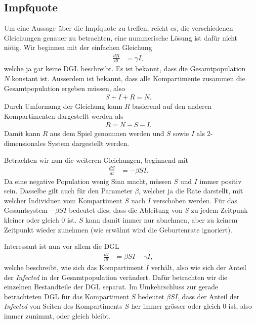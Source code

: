 \begin{refsection}
\section{Impfquote}
Um eine Aussage über die Impfquote zu treffen, reicht es, die verschiedenen Gleichungen genauer zu betrachten, eine nummerische Lösung ist dafür nicht nötig.
Wir beginnen mit der einfachen Gleichung
\begin{align*}
  \frac{dR}{dt} &= \gamma I,
\end{align*}
welche ja gar keine DGL beschreibt. 
Es ist bekannt, dass die Gesamtpopulation $N$ konstant ist. 
Ausserdem ist bekannt, dass alle Kompartimente zusammen die Gesamtpopulation ergeben müssen, also
\begin{align*}
  S + I + R = N.
\end{align*}
Durch Umformung der Gleichung kann $R$ basierend auf den anderen Kompartimenten dargestellt werden als
\begin{align*}
  R = N - S - I.
\end{align*}
Damit kann $R$ aus dem Spiel genommen werden und $S$ sowie $I$ als 2-dimensionales System dargestellt werden.

Betrachten wir nun die weiteren Gleichungen, beginnend mit 
\begin{align*}
  \frac{dS}{dt} & = -\beta S I.
\end{align*}
Da eine negative Population wenig Sinn macht, müssen $S$ und $I$ immer positiv sein. 
Dasselbe gilt auch für den Parameter $\beta$, welcher ja die Rate darstellt, mit welcher Individuen vom Kompartiment $S$ nach $I$ verschoben werden.
Für das Gesamtsystem $-\beta S I$ bedeutet dies, dass die Ableitung von $S$ zu jedem Zeitpunk kleiner oder gleich 0 ist. $S$ kann damit immer nur abnehmen, aber zu keinem Zeitpunkt wieder zunehmen (wie erwähnt wird die Geburtenrate ignoriert).

Interessant ist nun vor allem die DGL
\begin{align*}
  \frac{dI}{dt} & = \beta S I - \gamma I,
\end{align*}
welche beschreibt, wie sich das Kompartiment $I$ verhält, also wie sich der Anteil der \emph{Infected} in der Gesamtpopulation verändert.
Dafür betrachten wir die einzelnen Bestandteile der DGL separat. 
Im Umkehrschluss zur gerade betrachteten DGL für das Kompartiment $S$ bedeutet $\beta S I$, dass der Anteil der \emph{Infected} von Seiten des Kompartiments $S$ her immer grösser oder gleich 0 ist, also immer zunimmt, oder gleich bleibt.


\end{refsection}
